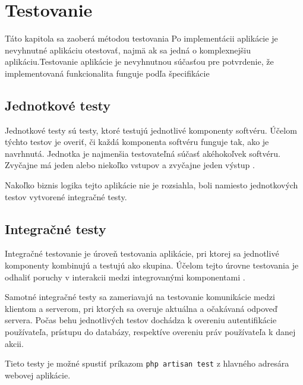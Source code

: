 \chapter{Testovanie}
Táto kapitola sa zaoberá métodou testovania Po implementácii aplikácie je nevyhnutné aplikáciu otestovať, najmä ak sa jedná o komplexnejšiu aplikáciu.Testovanie aplikácie je nevyhnutnou súčasťou pre potvrdenie, že implementovaná funkcionalita funguje podľa špecifikácie

\section{Jednotkové testy}
Jednotkové testy sú testy, ktoré testujú jednotlivé komponenty softvéru. Účelom týchto testov je overiť, či každá komponenta softvéru funguje tak, ako je navrhnutá. Jednotka je najmenšia testovateľná súčasť akéhokoľvek softvéru. Zvyčajne má jeden alebo niekoľko vstupov a zvyčajne jeden výstup \cite{co-je-unit-testing}.

Nakoľko biznis logika tejto aplikácie nie je rozsiahla, boli namiesto jednotkových testov vytvorené integračné testy.

\section{Integračné testy}
Integračné testovanie je úroveň testovania aplikácie, pri ktorej sa jednotlivé komponenty kombinujú a testujú ako skupina. Účelom tejto úrovne testovania je odhaliť poruchy v interakcii medzi integrovanými komponentami \cite{co-su-integracne-testy}.

Samotné integračné testy sa zameriavajú na testovanie komunikácie medzi klientom a serverom, pri ktorých sa overuje aktuálna a očakávaná odpoveď servera. Počas behu jednotlivých testov dochádza k overeniu autentifikácie používateľa, prístupu do databázy, respektíve overeniu práv používateľa k danej akcii.

Tieto testy je možné spustiť príkazom \texttt{php artisan test} z hlavného adresára webovej aplikácie.

